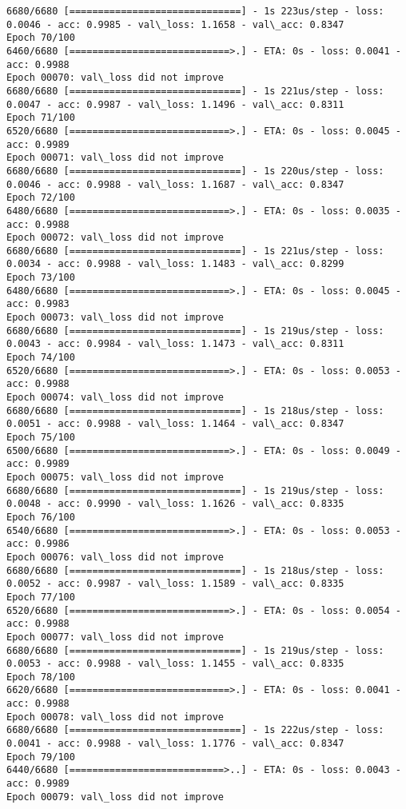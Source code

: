 \documentclass[11pt]{article}
\begin{document}
\begin{Verbatim}[commandchars=\\\{\}]
6680/6680 [==============================] - 1s 223us/step - loss: 0.0046 - acc: 0.9985 - val\_loss: 1.1658 - val\_acc: 0.8347
Epoch 70/100
6460/6680 [============================>.] - ETA: 0s - loss: 0.0041 - acc: 0.9988
Epoch 00070: val\_loss did not improve
6680/6680 [==============================] - 1s 221us/step - loss: 0.0047 - acc: 0.9987 - val\_loss: 1.1496 - val\_acc: 0.8311
Epoch 71/100
6520/6680 [============================>.] - ETA: 0s - loss: 0.0045 - acc: 0.9989
Epoch 00071: val\_loss did not improve
6680/6680 [==============================] - 1s 220us/step - loss: 0.0046 - acc: 0.9988 - val\_loss: 1.1687 - val\_acc: 0.8347
Epoch 72/100
6480/6680 [============================>.] - ETA: 0s - loss: 0.0035 - acc: 0.9988
Epoch 00072: val\_loss did not improve
6680/6680 [==============================] - 1s 221us/step - loss: 0.0034 - acc: 0.9988 - val\_loss: 1.1483 - val\_acc: 0.8299
Epoch 73/100
6480/6680 [============================>.] - ETA: 0s - loss: 0.0045 - acc: 0.9983
Epoch 00073: val\_loss did not improve
6680/6680 [==============================] - 1s 219us/step - loss: 0.0043 - acc: 0.9984 - val\_loss: 1.1473 - val\_acc: 0.8311
Epoch 74/100
6520/6680 [============================>.] - ETA: 0s - loss: 0.0053 - acc: 0.9988
Epoch 00074: val\_loss did not improve
6680/6680 [==============================] - 1s 218us/step - loss: 0.0051 - acc: 0.9988 - val\_loss: 1.1464 - val\_acc: 0.8347
Epoch 75/100
6500/6680 [============================>.] - ETA: 0s - loss: 0.0049 - acc: 0.9989
Epoch 00075: val\_loss did not improve
6680/6680 [==============================] - 1s 219us/step - loss: 0.0048 - acc: 0.9990 - val\_loss: 1.1626 - val\_acc: 0.8335
Epoch 76/100
6540/6680 [============================>.] - ETA: 0s - loss: 0.0053 - acc: 0.9986
Epoch 00076: val\_loss did not improve
6680/6680 [==============================] - 1s 218us/step - loss: 0.0052 - acc: 0.9987 - val\_loss: 1.1589 - val\_acc: 0.8335
Epoch 77/100
6520/6680 [============================>.] - ETA: 0s - loss: 0.0054 - acc: 0.9988
Epoch 00077: val\_loss did not improve
6680/6680 [==============================] - 1s 219us/step - loss: 0.0053 - acc: 0.9988 - val\_loss: 1.1455 - val\_acc: 0.8335
Epoch 78/100
6620/6680 [============================>.] - ETA: 0s - loss: 0.0041 - acc: 0.9988
Epoch 00078: val\_loss did not improve
6680/6680 [==============================] - 1s 222us/step - loss: 0.0041 - acc: 0.9988 - val\_loss: 1.1776 - val\_acc: 0.8347
Epoch 79/100
6440/6680 [===========================>..] - ETA: 0s - loss: 0.0043 - acc: 0.9989
Epoch 00079: val\_loss did not improve

\end{Verbatim}
\end{document}
